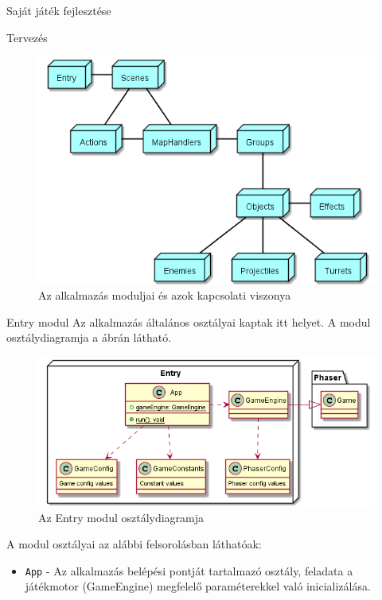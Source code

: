 \begin{MyChapter}{Saját játék fejlesztése}
\begin{MySection}{Tervezés}
		\begin{figure}[h!]
			\centering
			\includegraphics[width=1\textwidth]{kepek/uml/modules.png}
			\caption{Az alkalmazás moduljai és azok kapcsolati viszonya}
			\label{fig:uml:module}
		\end{figure}
		
		
		\begin{MySubSection}{Entry modul}
			Az alkalmazás általános osztályai kaptak itt helyet.
			A modul osztálydiagramja a  ábrán látható.
			
			\begin{figure}[h!]
				\centering
				\includegraphics[width=1.05\textwidth]{kepek/uml/entry/entry.png}
				\caption{Az Entry modul osztálydiagramja}
				\label{fig:uml:entry}
			\end{figure}
		
			A modul osztályai az alábbi felsorolásban láthatóak:
			\begin{itemize}
				\item \texttt{App} - Az alkalmazás belépési pontját tartalmazó osztály, feladata a játékmotor (GameEngine) megfelelő paraméterekkel való inicializálása.
				

\end{itemize}
\end{MySubSection}
\end{MySection}
\end{MyChapter}

